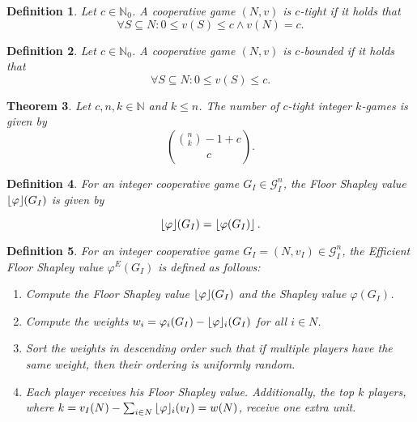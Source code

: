 \documentclass[12pt]{report}
\newcounter{theorem}
\newtheorem{definition}[theorem]{Definition}
\newtheorem{theorem}{Theorem}
\def\phi{\varphi}
\newcommand{\floor}[1]{\left\lfloor #1 \right\rfloor}
\newcommand{\floorphi}{\ensuremath{\floor{\phi}\hspace{-0.5ex}}}
\begin{document}
\begin{definition}
    \label{def:c-tight}
    Let $c \in \mathbb{N}_0$.
    A cooperative game $(N,v)$ is \emph{$c$-tight} if it holds that
    \begin{displaymath}\label{eq:c-tight}
        \forall S \subseteq N: 0 \leq v(S) \leq c \land v(N) = c.
    \end{displaymath}
\end{definition}

\begin{definition}
    \label{def:c-bounded}
    Let $c \in \mathbb{N}_0$.
    A cooperative game $(N,v)$ is \emph{$c$-bounded} if it holds that
    \begin{displaymath}\label{eq:c-bounded}
        \forall S \subseteq N: 0 \leq v(S) \leq c.
    \end{displaymath}
\end{definition}

\begin{theorem}
    \label{theorem:number_of_k_games_c-tight}
    Let $c, n, k \in \mathbb{N}$ and $k \leq n$. The number of $c$-tight integer $k$-games is given by
    \begin{displaymath}
        \binom{\binom{n}{k}-1+c}{c}.
    \end{displaymath}
\end{theorem}

\begin{definition}
    \label{def:floor_shapley_value}
    For an integer cooperative game $G_I \in \mathcal{G}_I^n$, the \emph{Floor Shapley value} $\floorphi(G_I)$ is given by

    \vspace{-1cm}
    \begin{displaymath}
        \floorphi(G_I) = \floor{\phi(G_I)}.
    \end{displaymath}
\end{definition}


\begin{definition}
    \label{def:efficient_floor_shapley_value}
    For an integer cooperative game $G_I=(N,v_I) \in \mathcal{G}_I^n$, the \emph{Efficient Floor Shapley value} $\phi^E(G_I)$ is defined as follows:
    \begin{enumerate}
        \item Compute the Floor Shapley value $\floorphi(G_I)$ and the Shapley value $\phi(G_I)$.
        \item Compute the weights $w_i = \phi_i(G_I) - \floorphi_i(G_I)$ for all $i \in N$.
        \item Sort the weights in descending order such that if multiple players have the same weight, then their ordering is uniformly random.
        \item Each player receives his Floor Shapley value. Additionally, the top $k$ players, where $k = v_I(N) - \sum_{i \in N} \floorphi_i(v_I) = w(N)$, receive one extra unit.
    \end{enumerate}
\end{definition}
\end{document}
